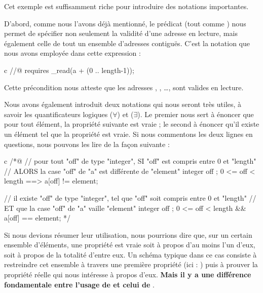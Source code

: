 

Cet exemple est suffisamment riche pour introduire des notations importantes.


D'abord, comme nous l'avons déjà mentionné, le prédicat
 (tout comme
) nous permet de spécifier non seulement la
validité d'une adresse en lecture, mais également celle de tout un ensemble
d'adresses contiguës. C'est la notation que nous avons employée dans cette
expression :


\begin{CodeBlock}{c}
//@ requires \valid_read(a + (0 .. length-1));
\end{CodeBlock}


Cette précondition nous atteste que les adresses ,
, \ldots{},  sont valides en lecture.


Nous avons également introduit deux notations qui nous seront très utiles, à
savoir les quantificateurs logiques 
($\forall$) et  ($\exists$).
Le premier nous sert à énoncer que pour tout élément, la propriété
suivante est vraie ; le second à énoncer qu'il existe un élément tel que la
propriété est vraie. Si nous commentons les deux lignes en questions, nous
pouvons les lire de la façon suivante :


\begin{CodeBlock}{c}
/*@
// pour tout "off" de type "integer", SI "off" est compris entre 0 et "length"
//                                    ALORS la case "off" de "a" est différente de "element"
\forall integer off ; 0 <= off < length ==> a[off] != element;

// il existe "off" de type "integer", tel que "off" soit compris entre 0 et "length"
//                                    ET que la case "off" de "a" vaille "element"
\exists integer off ; 0 <= off < length && a[off] == element;
*/
\end{CodeBlock}


Si nous devions résumer leur utilisation, nous pourrions dire que, sur un certain
ensemble d'éléments, une propriété est vraie soit à propos d'au moins l'un
d'eux, soit à propos de la totalité d'entre eux. Un schéma typique dans ce cas
consiste à restreindre cet ensemble à travers une première propriété (ici :
) puis à prouver la propriété réelle qui nous
intéresse à propos d'eux. \textbf{Mais il y a une différence fondamentale entre
l'usage de  et celui de
}.


